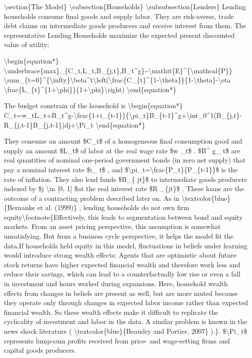 \documentclass[10pt,math=newtx,citestyle=gb7714-2015,bibstyle=gb7714-2015]{elegantbook}
\begin{document}
	\textbackslash{}section\{The Model\}
	\textbackslash{}subsection\{Households\}
	\textbackslash{}subsubsection\{Lenders\}
	Lending households consume final goods and supply labor. They are risk-averse, trade debt claims on intermediate goods producers and receive interest from them.
	The representative Lending Households maximize the expected present discounted value of utility:
	
	\textbackslash{}begin\{equation*\}
	\textbackslash{}underbrace\{max\}\_\{C\_t,L\_t,B\_\{j,t\},B\_t\^{}g\}\~{}\textbackslash{}mathit\{E\}\^{}\{\textbackslash{}mathcal\{P\}\} \textbackslash{}sum\_\{t=0\}\^{}\{\textbackslash{}infty\}\textbackslash{}beta\^{}t\textbackslash{}left(\textbackslash{}frac\{C\_\{t\}\^{}\{1-\textbackslash{}theta\}\}\{1-\textbackslash{}theta\}-\textbackslash{}eta \textbackslash{}frac\{L\_\{t\}\^{}\{1+\textbackslash{}phi\}\}\{1+\textbackslash{}phi\}\textbackslash{}right)
	\textbackslash{}end\{equation*\}
	
	The budget constrain of the household is
	\textbackslash{}begin\{equation*\}
	C\_t=w\_tL\_t+B\_t\^{}g-\textbackslash{}frac\{1+i\_\{t-1\}\}\{\textbackslash{}pi\_t\}B\_\{t-1\}\^{}g+\textbackslash{}int\_0\^{}1(B\_\{j,t\}-R\_\{j,t-1\}B\_\{j,t-1\})dj+\textbackslash{}Pi\_t
	\textbackslash{}end\{equation*\}
	
	They consume an amount \$C\_t\$ of a homogeneous final consumption good and supply an amount \$L\_t\$ of labor at the real wage rate \$w \_t\$ . \$B\^{} g\_ t\$ are real quantities of nominal one-period government bonds (in zero net supply) that pay a nominal interest rate \$i\_ t\$ , and \$\textbackslash{}pi\_t=\textbackslash{}frac\{P\_t\}\{P\_\{t-1\}\}\$ is the rate of inflation. They also lend funds \$B\_\{ jt\}\$ to intermediate goods producers indexed by \$j \textbackslash{}in [0, 1] \$at the real interest rate \$R \_\{jt\}\$ . These loans are the outcome of a contracting problem described later on. As in \textbackslash{}textcolor\{blue\}\{Bernanke et al. (1999)\} , lending households do not own firm equity\textbackslash{}footnote\{Effectively, this leads to segmentation between bond and equity markets. From an asset pricing perspective, this assumption is somewhat unsatisfying. But from a business cycle perspective, it helps the model fit the data,If households held equity in this model, 
	fluctuations in beliefs under learning would introduce strong wealth effects: Agents that are optimistic about future stock returns have higher expected financial wealth and therefore work less and reduce their savings, which can lead to a counterfactually low rise or even a fall in investment and hours worked during expansions. Here, household wealth effects from changes in beliefs are present as well, but are more muted because they operate only through changes in expected labor income rather than expected financial wealth. So these wealth effects make it difficult to replicate the cyclicality of investment and labor in the data. A similar problem is known in the news shock literature ( \textbackslash{}textcolor\{blue\}\{Beaudry and Portier, 2007\} ).\}. \$\textbackslash{}Pi\_t\$ represents lump-sum profits received from price- and wage-setting firms and capital goods producers. 
	
\end{document}
